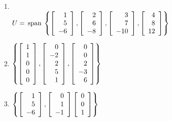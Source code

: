 {{\begin{multicols}{2}
\begin{ex}
\begin{enumerate}[label={\alph*.}]
\item \hspace{1em} \\
\hspace*{-2.5em}$
U = \thinspace\operatorname{span\medspace}
\left\{
\left[ \begin{array}{r}
1\\
5\\
-6
\end{array} \right], \left[ \begin{array}{r}
2\\
6\\
-8
\end{array} \right], \left[ \begin{array}{r}
3\\
7\\
-10
\end{array} \right], \left[ \begin{array}{r}
4\\
8\\
12
\end{array} \right]
\right\}$

\end{enumerate}
\begin{sol}
\begin{enumerate}[label={\alph*.}]
\setcounter{enumi}{1}
\item  
$\left\{
\left[ \begin{array}{r}
1\\
1\\
0\\
0\\
0
\end{array} \right], \left[ \begin{array}{r}
0\\
-2\\
2\\
5\\
1
\end{array} \right], \left[ \begin{array}{r}
0\\
0\\
2\\
-3\\
6
\end{array} \right]
\right\}$

\setcounter{enumi}{3}
\item 
$\left\{
\left[ \begin{array}{r}
1\\
5\\
-6
\end{array} \right], \left[ \begin{array}{r}
0\\
1\\
-1
\end{array} \right]
\left[ \begin{array}{r}
0\\
0\\
1
\end{array} \right]
\right\}$


\end{enumerate}
\end{sol}
\end{ex}
\end{multicols}}}
